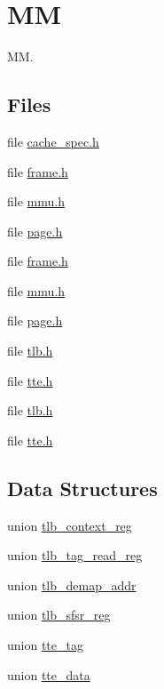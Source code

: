 \hypertarget{group__RTEMSBSPsSPARC64mm}{}\section{MM}
\label{group__RTEMSBSPsSPARC64mm}


MM.  


\subsection*{Files}
\begin{DoxyCompactItemize}
\item 
file \mbox{\hyperlink{cache__spec_8h}{cache\+\_\+spec.\+h}}
\item 
file \mbox{\hyperlink{frame_8h}{frame.\+h}}
\item 
file \mbox{\hyperlink{sparc64_2include_2arch_2mm_2mmu_8h}{mmu.\+h}}
\item 
file \mbox{\hyperlink{bsps_2sparc64_2include_2arch_2mm_2page_8h}{page.\+h}}
\item 
file \mbox{\hyperlink{sun4u_2frame_8h}{frame.\+h}}
\item 
file \mbox{\hyperlink{sparc64_2include_2arch_2mm_2sun4u_2mmu_8h}{mmu.\+h}}
\item 
file \mbox{\hyperlink{bsps_2sparc64_2include_2arch_2mm_2sun4u_2page_8h}{page.\+h}}
\item 
file \mbox{\hyperlink{sun4u_2tlb_8h}{tlb.\+h}}
\item 
file \mbox{\hyperlink{sun4u_2tte_8h}{tte.\+h}}
\item 
file \mbox{\hyperlink{tlb_8h}{tlb.\+h}}
\item 
file \mbox{\hyperlink{tte_8h}{tte.\+h}}
\end{DoxyCompactItemize}
\subsection*{Data Structures}
\begin{DoxyCompactItemize}
\item 
union \mbox{\hyperlink{uniontlb__context__reg}{tlb\+\_\+context\+\_\+reg}}
\item 
union \mbox{\hyperlink{uniontlb__tag__read__reg}{tlb\+\_\+tag\+\_\+read\+\_\+reg}}
\item 
union \mbox{\hyperlink{uniontlb__demap__addr}{tlb\+\_\+demap\+\_\+addr}}
\item 
union \mbox{\hyperlink{uniontlb__sfsr__reg}{tlb\+\_\+sfsr\+\_\+reg}}
\item 
union \mbox{\hyperlink{uniontte__tag}{tte\+\_\+tag}}
\item 
union \mbox{\hyperlink{uniontte__data}{tte\+\_\+data}}
\end{DoxyCompactItemize}
